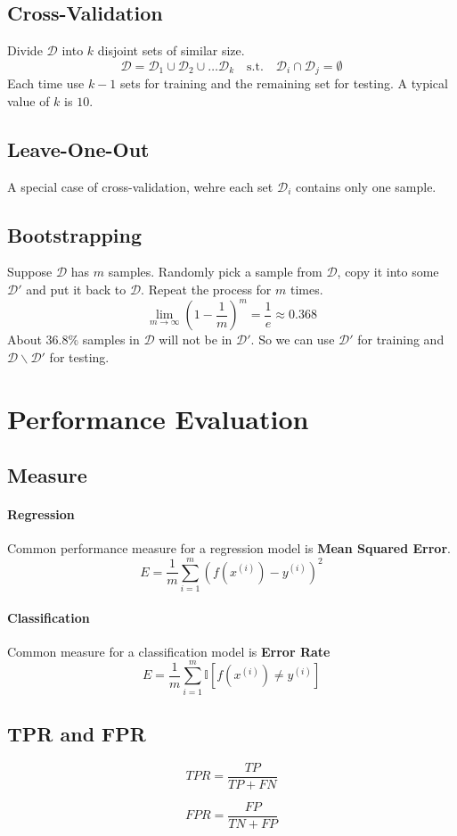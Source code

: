 \subsection{Cross-Validation}
Divide $\mathcal{D}$ into $k$ disjoint sets of similar size.
\[ \mathcal{D} = \mathcal{D}_1 \cup \mathcal{D}_2 \cup \dots \mathcal{D}_k \quad \text{s.t.} \quad \mathcal{D}_i \cap \mathcal{D}_j = \emptyset \]
Each time use $k-1$ sets for training and the remaining set for testing. 
A typical value of $k$ is $10$.

\subsection{Leave-One-Out}
A special case of cross-validation, wehre each set $\mathcal{D}_i$ contains only one sample.

\subsection{Bootstrapping}
Suppose $\mathcal{D}$ has $m$ samples. Randomly pick a sample from $\mathcal{D}$, copy it into some $\mathcal{D}'$ and put it back to $\mathcal{D}$. Repeat the process for $m$ times.
\[ \lim_{m\to\infty}(1-\frac{1}{m})^m = \frac{1}{e} \approx 0.368 \]
About $36.8\%$ samples in $\mathcal{D}$ will not be in $\mathcal{D}'$. So we can use $\mathcal{D}'$ for training and $\mathcal{D}\backslash\mathcal{D}'$ for testing.

\section{Performance Evaluation}
\subsection{Measure}
\paragraph{Regression} Common performance measure for a regression model is \textbf{Mean Squared Error}.
\[ E = \frac{1}{m}\sum_{i=1}^m(f(x^{(i)}) - y^{(i)})^2 \]
\paragraph{Classification} Common measure for a classification model is \textbf{Error Rate}
\[ E = \frac{1}{m}\sum_{i=1}^m\mathbb{I}[f(x^{(i)}) \neq y^{(i)}] \]

\subsection{TPR and FPR}
\begin{definition}
    \[ TPR = \frac{TP}{TP + FN} \]
\end{definition}
\begin{definition}[FPR]
    \[ FPR = \frac{FP}{TN + FP} \]
\end{definition}

